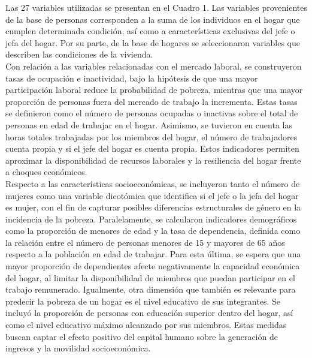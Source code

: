 \documentclass[12pt,a4paper,onecolumn]{article}
\begin{document}
Las 27 variables utilizadas se presentan en el Cuadro 1. Las variables provenientes de la base de personas corresponden a la suma de los individuos en el hogar que cumplen determinada condición, así como a características exclusivas del jefe o jefa del hogar. Por su parte, de la base de hogares se seleccionaron variables que describen las condiciones de la vivienda.\\

Con relación a las variables relacionadas con el mercado laboral, se construyeron tasas de ocupación e inactividad, bajo la hipótesis de que una mayor participación laboral reduce la probabilidad de pobreza, mientras que una mayor proporción de personas fuera del mercado de trabajo la incrementa. Estas tasas se definieron como el número de personas ocupadas o inactivas sobre el total de personas en edad de trabajar en el hogar. Asimismo, se tuvieron en cuenta las horas totales trabajadas por los miembros del hogar, el número de trabajadores cuenta propia y si el jefe del hogar es cuenta propia. Estos indicadores permiten aproximar la disponibilidad de recursos laborales y la resiliencia del hogar frente a choques económicos.\\

Respecto a las características socioeconómicas, se incluyeron tanto el número de mujeres como una variable dicotómica que identifica si el jefe o la jefa del hogar es mujer, con el fin de capturar posibles diferencias estructurales de género en la incidencia de la pobreza. Paralelamente, se calcularon indicadores demográficos como la proporción de menores de edad y la tasa de dependencia, definida como la relación entre el número de personas menores de 15 y mayores de 65 años respecto a la población en edad de trabajar. Para esta última, se espera que una mayor proporción de dependientes afecte negativamente la capacidad económica del hogar, al limitar la disponibilidad de miembros que puedan participar en el trabajo remunerado. Igualmente, otra dimensión que también es relevante para predecir la pobreza de un hogar es el nivel educativo de sus integrantes. Se incluyó la proporción de personas con educación superior dentro del hogar, así como el nivel educativo máximo alcanzado por sus miembros. Estas medidas buscan captar el efecto positivo del capital humano sobre la generación de ingresos y la movilidad socioeconómica.\\
\end{document}
